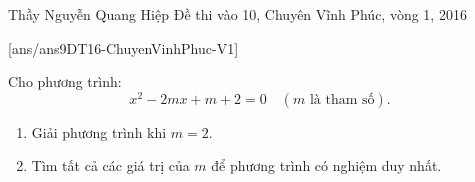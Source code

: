 \begin{name}
{Thầy  Nguyễn Quang Hiệp}
{Đề thi vào 10, Chuyên Vĩnh Phúc, vòng 1, 2016}
\end{name}
\setcounter{ex}{0}
[ans/ans9DT16-ChuyenVinhPhuc-V1]
	\begin{ex}%
		Cho phương trình: $$x^2-2mx+m+2=0 \quad (m \text{ là tham số}).$$
		\begin{enumerate}
			\item Giải phương trình khi $ m=2. $
			\item Tìm tất cả các giá trị của $ m $ để phương trình có nghiệm duy nhất.
		\end{enumerate}
	\end{ex}

